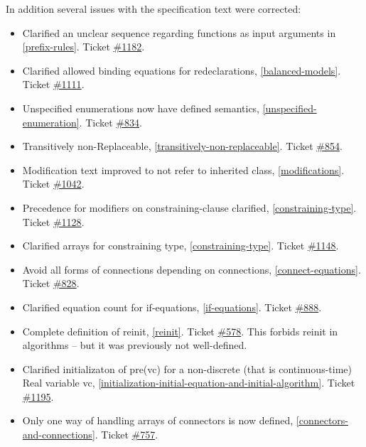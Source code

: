 In addition several issues with the specification text were corrected:

\begin{itemize}
\item
  Clarified an unclear sequence regarding functions as input arguments
  in \ref{prefix-rules}. Ticket
  \href{https://trac.modelica.org/Modelica/ticket/1182}{\#1182}.
\item
  Clarified allowed binding equations for redeclarations, \ref{balanced-models}.
  Ticket \href{https://trac.modelica.org/Modelica/ticket/1111}{\#1111}.
\item
  Unspecified enumerations now have defined semantics, \ref{unspecified-enumeration}.
  Ticket \href{https://trac.modelica.org/Modelica/ticket/834}{\#834}.
\item
  Transitively non-Replaceable, \ref{transitively-non-replaceable}. Ticket
  \href{https://trac.modelica.org/Modelica/ticket/854}{\#854}.
\item
  Modification text improved to not refer to inherited class, 
  \ref{modifications}. Ticket
  \href{https://trac.modelica.org/Modelica/ticket/1042}{\#1042}.
\item
  Precedence for modifiers on constraining-clause clarified, \ref{constraining-type}. Ticket
  \href{https://trac.modelica.org/Modelica/ticket/1128}{\#1128}.
\item
  Clarified arrays for constraining type, \ref{constraining-type}. Ticket
  \href{https://trac.modelica.org/Modelica/ticket/1148}{\#1148}.
\item
  Avoid all forms of connections depending on connections, 
  \ref{connect-equations}. Ticket
  \href{https://trac.modelica.org/Modelica/ticket/828}{\#828}.
\item
  Clarified equation count for if-equations, \ref{if-equations}. Ticket
  \href{https://trac.modelica.org/Modelica/ticket/888}{\#888}.
\item
  Complete definition of reinit, \ref{reinit}. Ticket
  \href{https://trac.modelica.org/Modelica/ticket/578}{\#578}. This
  forbids reinit in algorithms -- but it was previously not
  well-defined.
\item
  Clarified initializaton of pre(vc) for a non-discrete (that is
  continuous-time) Real variable vc, \ref{initialization-initial-equation-and-initial-algorithm}. Ticket
  \href{https://trac.modelica.org/Modelica/ticket/1195}{\#1195}.
\item
  Only one way of handling arrays of connectors is now defined, 
  \ref{connectors-and-connections}. Ticket \href{https://trac.modelica.org/Modelica/ticket/757}{\#757}.

\end{itemize}
